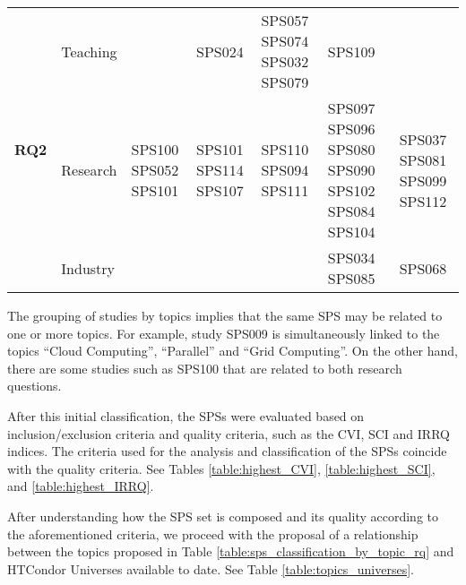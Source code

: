 \begin{table}[htbp]
\begin{tabularx}{\textwidth}{p{0.8cm}p{2.5cm}>{\raggedright\arraybackslash}X>{\raggedright\arraybackslash}X>{\raggedright\arraybackslash}X>{\raggedright\arraybackslash}X>{\raggedright\arraybackslash}X}
		\midrule
		\multirow{3}{*}[-2em]{\textbf{RQ2}}   & Teaching                &                                                         & SPS024                                                                                                                        & SPS057 SPS074 SPS032 SPS079                                                                & SPS109                                                                              &                                    \\
		\addlinespace[0.3em]
		                                      & Research                & SPS100 SPS052 SPS101                                    & SPS101 SPS114 SPS107                                                                                                          & SPS110 SPS094 SPS111                                                                       & SPS097 SPS096 SPS080 SPS090 SPS102 SPS084 SPS104                                    & SPS037 SPS081 SPS099 SPS112        \\
		\addlinespace[0.3em]
		                                      & Industry                &                                                         &                                                                                                                               &                                                                                            & SPS034 SPS085                                                                       & SPS068                             \\
		\bottomrule
	\end{tabularx}
\end{table}

The grouping of studies by topics implies that the same SPS may be related to one or more topics. For example, study SPS009 is simultaneously linked to the topics ``Cloud Computing'', ``Parallel'' and ``Grid Computing''. On the other hand, there are some studies such as SPS100 that are related to both research questions.

After this initial classification, the SPSs were evaluated based on inclusion/exclusion criteria and quality criteria, such as the CVI, SCI and IRRQ indices. The criteria used for the analysis and classification of the SPSs coincide with the quality criteria. See Tables \ref{table:highest_CVI}, \ref{table:highest_SCI}, and \ref{table:highest_IRRQ}.

After understanding how the SPS set is composed and its quality according to the aforementioned criteria, we proceed with the proposal of a relationship between the topics proposed in Table \ref{table:sps_classification_by_topic_rq} and HTCondor Universes available to date. See Table \ref{table:topics_universes}.

